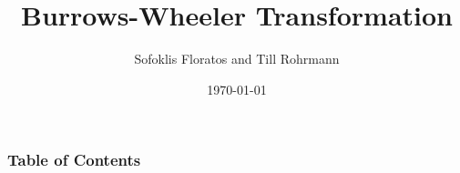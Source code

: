 
\usepackage[utf8]{inputenc}
\usepackage[T1]{fontenc}
\usepackage{lmodern}
\usepackage{amsthm}
\usepackage{amsmath}
\usepackage{graphicx}
\usepackage{float}
\usepackage{caption}
\captionsetup{labelformat=empty,labelsep=none}
\DeclareMathOperator*{\E}{\mathbb{E}}

\title{Burrows-Wheeler Transformation}
\author[S. Floratos \& T. Rohrmann]{Sofoklis Floratos and Till Rohrmann}
\date{\today}
\subject{Burrows-Wheeler Transformation}


		\frame{\titlepage}
		\begin{frame}
			\frametitle{Table of Contents}
			\tableofcontents
		\end{frame}
		
		
		
		
		

